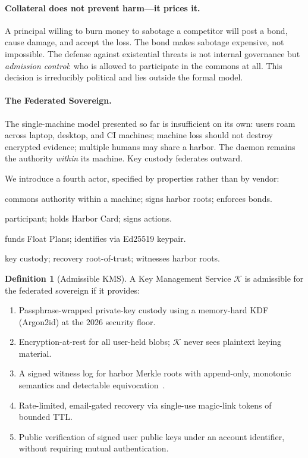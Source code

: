 \documentclass[11pt,a4paper]{article}
\theoremstyle{definition}
\newtheorem{definition}{Definition}[section]
\theoremstyle{remark}
\begin{document}
\paragraph{Collateral does not prevent harm---it prices it.} A principal willing to burn money to sabotage a competitor will post a bond, cause damage, and accept the loss. The bond makes sabotage expensive, not impossible. The defense against existential threats is not internal governance but \emph{admission control}: who is allowed to participate in the commons at all. This decision is irreducibly political and lies outside the formal model.

\paragraph{The Federated Sovereign.}\label{sec:federated-sovereign} The single-machine model presented so far is insufficient on its own: users roam across laptop, desktop, and CI machines; machine loss should not destroy encrypted evidence; multiple humans may share a harbor. The daemon remains the authority \emph{within} its machine. Key custody federates outward.

We introduce a fourth actor, specified by properties rather than by vendor:
\begin{description}[nosep]
  \item[Daemon] commons authority within a machine; signs harbor roots; enforces bonds.
  \item[Agent] participant; holds Harbor Card; signs actions.
  \item[Principal] funds Float Plans; identifies via Ed25519 keypair.
  \item[\textbf{KMS}] key custody; recovery root-of-trust; witnesses harbor roots.
\end{description}

\begin{definition}[Admissible KMS]\label{def:kms}
A Key Management Service $\mathcal{K}$ is admissible for the federated sovereign if it provides:
\begin{enumerate}[nosep]
  \item Passphrase-wrapped private-key custody using a memory-hard KDF (Argon2id) at the 2026 security floor.
  \item Encryption-at-rest for all user-held blobs; $\mathcal{K}$ never sees plaintext keying material.
  \item A signed witness log for harbor Merkle roots with append-only, monotonic semantics and detectable equivocation~\cite{laurie2013ct}.
  \item Rate-limited, email-gated recovery via single-use magic-link tokens of bounded TTL.
  \item Public verification of signed user public keys under an account identifier, without requiring mutual authentication.
\end{enumerate}
\end{definition}
\end{document}
